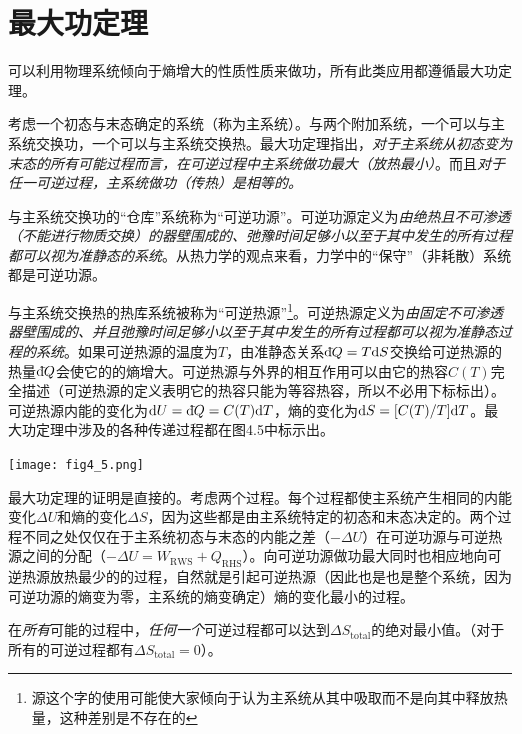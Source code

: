 \section{最大功定理}
\label{sec4.5}
可以利用物理系统倾向于熵增大的性质性质来做功，所有此类应用都遵循最大功定理。

考虑一个初态与末态确定的系统（称为主系统）。与两个附加系统，一个可以与主系统交换功，一个可以与主系统交换热。最大功定理指出，{\it 对于主系统从初态变为末态的所有可能过程而言，在可逆过程中主系统做功最大（放热最小）}。而且{\it 对于任一可逆过程，主系统做功（传热）是相等的。}

与主系统交换功的“仓库”系统称为“可逆功源”。可逆功源定义为{\it 由绝热且不可渗透（不能进行物质交换）的器壁围成的、弛豫时间足够小以至于其中发生的所有过程都可以视为准静态的系统}。从热力学的观点来看，力学中的“保守”（非耗散）系统都是可逆功源。

与主系统交换热的热库系统被称为“可逆热源”\footnote{源这个字的使用可能使大家倾向于认为主系统从其中吸取而不是向其中释放热量，这种差别是不存在的}。可逆热源定义为{\it 由固定不可渗透器壁围成的、并且弛豫时间足够小以至于其中发生的所有过程都可以视为准静态过程的系统}。如果可逆热源的温度为$T$，由准静态关系$\mathrm d\hspace*{-0.1em}\bar{}\hspace*{0.08em} Q = T\mathrm{d} S$交换给可逆热源的热量$\mathrm d\hspace*{-0.1em}\bar{}\hspace*{0.08em} Q$会使它的的熵增大。可逆热源与外界的相互作用可以由它的热容$C(T)$完全描述（可逆热源的定义表明它的热容只能为等容热容，所以不必用下标标出）。可逆热源内能的变化为$\mathrm{d} U = \mathrm d\hspace*{-0.1em}\bar{}\hspace*{0.08em} Q = C(T) \mathrm{d} T$，熵的变化为$\mathrm{d} S = [C(T)/T] \mathrm{d} T$。最大功定理中涉及的各种传递过程都在图4.5中标示出。

{
	\centering
	\texttt{[image: fig4\_5.png]}
}

最大功定理的证明是直接的。考虑两个过程。每个过程都使主系统产生相同的内能变化$\Delta U$和熵的变化$\Delta S$，因为这些都是由主系统特定的初态和末态决定的。两个过程不同之处仅仅在于主系统初态与末态的内能之差（$-\Delta U$）在可逆功源与可逆热源之间的分配（$-\Delta U = W_{\text{RWS}} + Q_{\text{RHS}}$）。向可逆功源做功最大同时也相应地向可逆热源放热最少的的过程，自然就是引起可逆热源（因此也是也是整个系统，因为可逆功源的熵变为零，主系统的熵变确定）熵的变化最小的过程。

在{\it 所有}可能的过程中，{\it 任何一个}可逆过程都可以达到$\Delta S_{\text{total}}$的绝对最小值。（对于所有的可逆过程都有$\Delta S_{\text{total}} = 0$）。

